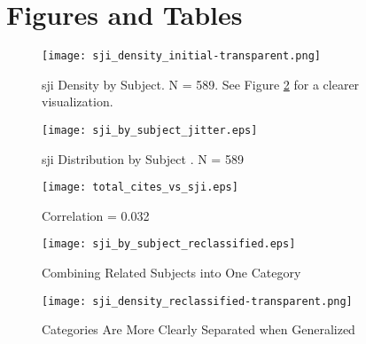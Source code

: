 \documentclass[12pt,english]{article}
\begin{document}
\vfill
\pagebreak{}
\clearpage

\section*{Figures and Tables}\label{sec:figTables}
\begin{figure}[ht]
\centering
\bigskip{}
\texttt{[image: sji\_density\_initial-transparent.png]}
\caption{sji Density by Subject. N = 589. See Figure \ref{fig:fig2} for a clearer visualization.}
\label{fig:fig1}
\end{figure}

\begin{figure}[ht]
\centering
\bigskip{}
\texttt{[image: sji\_by\_subject\_jitter.eps]}
\caption{sji Distribution by Subject . N = 589}
\label{fig:fig2}
\end{figure}


\begin{figure}
    \centering
    \texttt{[image: total\_cites\_vs\_sji.eps]}
    \caption{Correlation = 0.032}
    \label{fig:fig3}
\end{figure}


\begin{figure}
    \centering
    \texttt{[image: sji\_by\_subject\_reclassified.eps]}
    \caption{Combining Related Subjects into One Category}
    \label{fig:fig4}
\end{figure}


\begin{figure}
    \centering
    \texttt{[image: sji\_density\_reclassified-transparent.png]}
    \caption{Categories Are More Clearly Separated when Generalized}
    \label{fig:fig5}
\end{figure}
\end{document}
